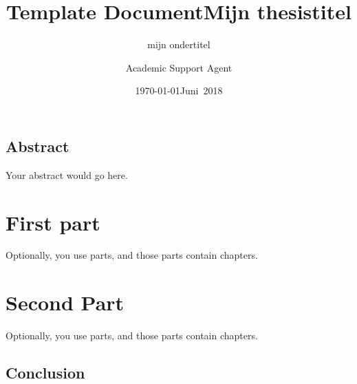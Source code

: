 \documentclass{article}
\title{Template Document}
\author{Academic Support Agent}
\date{\today}
\begin{document}
\maketitle

\maketitle%

\title{Mijn thesistitel}
%
\subtitle{mijn ondertitel}
\date{Juni~2018}%
%
\maketitle%

\chapter{Abstract}

Your abstract would go here.




\part{First part}%

Optionally, you use parts, and those parts contain chapters.

\part{Second Part}%

Optionally, you use parts, and those parts contain chapters.


\chapter{Conclusion}

\end{document}
